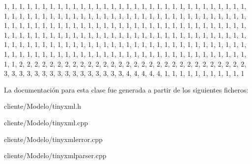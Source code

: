 \begin{DoxyCode}
 
{
        
                1,      1,      1,      1,      1,      1,      1,      1,      
      1,       1,      1,      1,      1,      1,      1,      1,      
                1,      1,      1,      1,      1,      1,      1,      1,      
      1,       1,      1,      1,      1,      1,      1,      1,      
                1,      1,      1,      1,      1,      1,      1,      1,      
      1,       1,      1,      1,      1,      1,      1,      1,      
                1,      1,      1,      1,      1,      1,      1,      1,      
      1,       1,      1,      1,      1,      1,      1,      1,      
                1,      1,      1,      1,      1,      1,      1,      1,      
      1,       1,      1,      1,      1,      1,      1,      1,      
                1,      1,      1,      1,      1,      1,      1,      1,      
      1,       1,      1,      1,      1,      1,      1,      1,      
                1,      1,      1,      1,      1,      1,      1,      1,      
      1,       1,      1,      1,      1,      1,      1,      1,      
                1,      1,      1,      1,      1,      1,      1,      1,      
      1,       1,      1,      1,      1,      1,      1,      1,      
                1,      1,      1,      1,      1,      1,      1,      1,      
      1,       1,      1,      1,      1,      1,      1,      1,      
                1,      1,      1,      1,      1,      1,      1,      1,      
      1,       1,      1,      1,      1,      1,      1,      1,      
                1,      1,      1,      1,      1,      1,      1,      1,      
      1,       1,      1,      1,      1,      1,      1,      1,      
                1,      1,      1,      1,      1,      1,      1,      1,      
      1,       1,      1,      1,      1,      1,      1,      1,      
                1,      1,      2,      2,      2,      2,      2,      2,      
      2,       2,      2,      2,      2,      2,      2,      2,      
                2,      2,      2,      2,      2,      2,      2,      2,      
      2,       2,      2,      2,      2,      2,      2,      2,      
                3,      3,      3,      3,      3,      3,      3,      3,      
      3,       3,      3,      3,      3,      3,      3,      3,      
                4,      4,      4,      4,      4,      1,      1,      1,      
      1,       1,      1,      1,      1,      1,      1,      1       
}
\end{DoxyCode}


\-La documentación para esta clase fue generada a partir de los siguientes ficheros\-:\begin{DoxyCompactItemize}
\item 
cliente/\-Modelo/tinyxml.\-h\item 
cliente/\-Modelo/tinyxml.\-cpp\item 
cliente/\-Modelo/tinyxmlerror.\-cpp\item 
cliente/\-Modelo/tinyxmlparser.\-cpp\end{DoxyCompactItemize}
